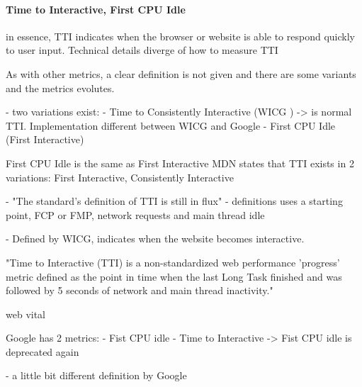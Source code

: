 

\paragraph{Time to Interactive, First CPU Idle}


in essence, TTI indicates when the browser or website is able to respond quickly to user input.
Technical details diverge of how to measure TTI

As with other metrics, a clear definition is not given and there are some variants and the metrics evolutes.

- two variations exist:
- Time to Consistently Interactive (WICG ) -> is normal TTI. Implementation different between WICG and Google
- First CPU Idle (First Interactive)


First CPU Idle is the same as First Interactive
MDN states that TTI exists in 2 variations: First Interactive, Consistently Interactive


- "The standard’s definition of TTI is still in flux"
- definitions uses a starting point, FCP or FMP, network requests and main thread idle





- Defined by WICG, indicates when the website becomes interactive.


"Time to Interactive (TTI) is a non-standardized web performance 'progress' metric defined as the point in time when the last Long Task finished and was followed by 5 seconds of network and main thread inactivity."



web vital

Google has 2 metrics:
- Fist CPU idle
- Time to Interactive
-> Fist CPU idle is deprecated again %



- a little bit different definition by Google





